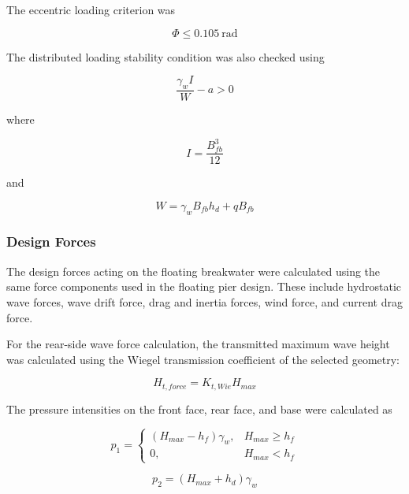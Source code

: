 \documentclass[a4paper, 11pt]{article}
\begin{document}
The eccentric loading criterion was

\begin{equation}
    \Phi\leq0.105~\mathrm{rad}
\end{equation}

The distributed loading stability condition was also checked using

\begin{equation}
    \frac{\gamma_w I}{W}-a>0
\end{equation}

where

\begin{equation}
    I=\frac{B_{fb}^{3}}{12}
\end{equation}

and

\begin{equation}
    W=\gamma_w B_{fb}h_d+qB_{fb}
\end{equation}

\subsubsection{Design Forces}

\hspace*{0.5cm} The design forces acting on the floating breakwater were calculated using the same force components used in the floating pier design. These include hydrostatic wave forces, wave drift force, drag and inertia forces, wind force, and current drag force.

For the rear-side wave force calculation, the transmitted maximum wave height was calculated using the Wiegel transmission coefficient of the selected geometry:

\begin{equation}
    H_{t,force}=K_{t,Wie}H_{max}
\end{equation}

The pressure intensities on the front face, rear face, and base were calculated as

\begin{equation}
    p_1=
    \begin{cases}
    (H_{max}-h_f)\gamma_w, & H_{max}\geq h_f \\
    0, & H_{max}<h_f
    \end{cases}
\end{equation}

\begin{equation}
    p_2=(H_{max}+h_d)\gamma_w
\end{equation}
\end{document}
